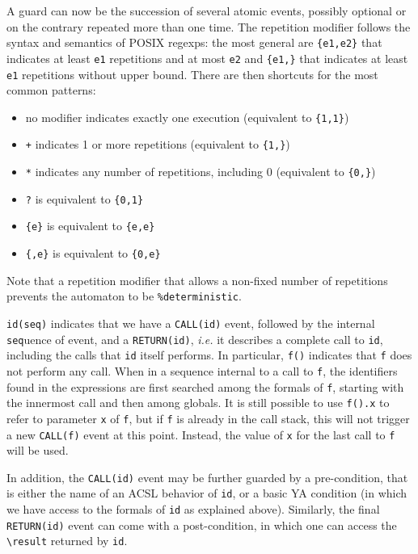 \documentclass{report}
\begin{document}
A guard can now be the succession of several atomic events, possibly optional
or on the contrary repeated more than one time. The repetition modifier
follows the syntax and semantics of POSIX regexps: the most general are
\lstinline|{e1,e2}| that indicates at least \lstinline|e1| repetitions and at
most \lstinline|e2| and \lstinline|{e1,}| that indicates at least 
\texttt{e1} repetitions without upper bound. There are then shortcuts for the
most common patterns:
\begin{itemize}
\item no modifier indicates exactly one execution (equivalent to
\lstinline|{1,1}|)
\item \lstinline|+| indicates 1 or more repetitions 
(equivalent to \lstinline|{1,}|)
\item \lstinline|*| indicates any number of repetitions, including 0
  (equivalent to \lstinline|{0,}|)
\item \lstinline|?| is equivalent to \lstinline|{0,1}|
\item \lstinline|{e}| is equivalent to \lstinline|{e,e}|
\item \lstinline|{,e}| is equivalent to \lstinline|{0,e}|
\end{itemize}

Note that a repetition modifier that allows a non-fixed number of
repetitions prevents the automaton to be \lstinline|%deterministic|.

\lstinline|id(seq)| indicates that we have a \lstinline|CALL(id)| event,
followed by the internal \texttt{seq}uence of event, and a 
\lstinline|RETURN(id)|,
\textit{i.e.} it describes a complete call to \texttt{id}, including the calls
that \lstinline|id| itself performs. In particular, \lstinline|f()| indicates 
that \lstinline|f| does not perform any call.
When in a sequence internal to a call to \lstinline|f|, the identifiers found in
the expressions are first searched among the formals of \lstinline|f|, 
starting with the innermost call and then among globals. It is still possible
to use \lstinline|f().x| to refer to parameter \lstinline|x| of \lstinline|f|, 
but if \lstinline|f| is already in the call stack, this will not trigger a new 
\lstinline|CALL(f)| event at this point. 
Instead, the value of \lstinline|x| for the
last call to \lstinline|f| will be used.

In addition, the \lstinline|CALL(id)| event may be further guarded by a 
pre-condition, that is either the name of an ACSL behavior of \lstinline|id|, 
or a basic YA condition (in which we have access to the formals of
 \lstinline|id| as explained above). Similarly, the final 
\lstinline|RETURN(id)| event can come with a 
post-condition, in which one can access the \lstinline|\result|
returned by \lstinline|id|.
\end{document}
